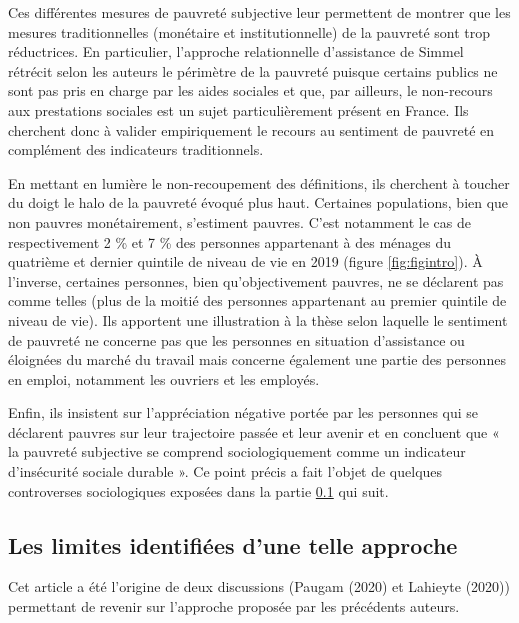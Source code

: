 \documentclass[12pt,a4paper]{reedthesis}
\begin{document}
Ces différentes mesures de pauvreté subjective leur permettent de montrer que les mesures traditionnelles (monétaire et institutionnelle) de la pauvreté sont trop réductrices. En particulier, l'approche relationnelle d'assistance de Simmel rétrécit selon les auteurs le périmètre de la pauvreté puisque certains publics ne sont pas pris en charge par les aides sociales et que, par ailleurs, le non-recours aux prestations sociales est un sujet particulièrement présent en France. Ils cherchent donc à valider empiriquement le recours au sentiment de pauvreté en complément des indicateurs traditionnels.

En mettant en lumière le non-recoupement des définitions, ils cherchent à toucher du doigt le halo de la pauvreté évoqué plus haut. Certaines populations, bien que non pauvres monétairement, s'estiment pauvres. C'est notamment le cas de respectivement 2 \% et 7 \% des personnes appartenant à des ménages du quatrième et dernier quintile de niveau de vie en 2019 (figure \ref{fig:figintro}). À l'inverse, certaines personnes, bien qu'objectivement pauvres, ne se déclarent pas comme telles (plus de la moitié des personnes appartenant au premier quintile de niveau de vie). Ils apportent une illustration à la thèse selon laquelle le sentiment de pauvreté ne concerne pas que les personnes en situation d'assistance ou éloignées du marché du travail mais concerne également une partie des personnes en emploi, notamment les ouvriers et les employés.

Enfin, ils insistent sur l'appréciation négative portée par les personnes qui se déclarent pauvres sur leur trajectoire passée et leur avenir et en concluent que « la pauvreté subjective se comprend sociologiquement comme un indicateur d'insécurité sociale durable ». Ce point précis a fait l'objet de quelques controverses sociologiques exposées dans la partie \ref{sec:limitesduvoux} qui suit.

\hypertarget{sec:limitesduvoux}{%
\subsection{Les limites identifiées d'une telle approche}\label{sec:limitesduvoux}}

Cet article a été l'origine de deux discussions (Paugam (2020) et Lahieyte (2020)) permettant de revenir sur l'approche proposée par les précédents auteurs.
\end{document}
